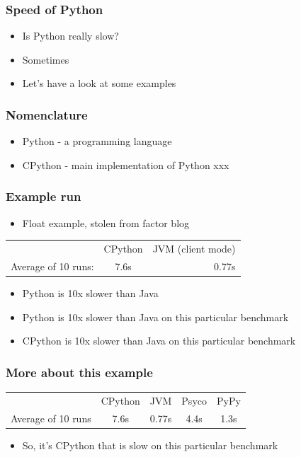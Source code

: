 \documentclass[utf8x]{beamer}
\begin{document}
\begin{frame}
  \frametitle{Speed of Python}
  \begin{itemize}
    \item Is Python really slow?
      \pause
    \item Sometimes
      \pause
    \item Let's have a look at some examples
  \end{itemize}

\end{frame}

\begin{frame}
  \frametitle{Nomenclature}
  \begin{itemize}
    \item Python - a programming language
    \item CPython - main implementation of Python
      xxx
  \end{itemize}
\end{frame}

\begin{frame}
  \frametitle{Example run}
  \begin{itemize}
    \item Float example, stolen from factor blog
  \end{itemize}
  \vspace{.5cm}
  \begin{tabular}{| l | c | r |}
    \hline
    & CPython & JVM (client mode) \\
    Average of 10 runs: & 7.6s & 0.77s \\
    \hline
  \end{tabular}
  \vspace{.5cm}
  \pause
  \begin{itemize}
    \item Python is 10x slower than Java
      \pause
    \item Python is 10x slower than Java on this particular benchmark
      \pause
    \item CPython is 10x slower than Java on this particular benchmark
  \end{itemize}
\end{frame}

\begin{frame}
  \frametitle{More about this example}
  \begin{tabular}{| l | c | c | c | c |}
    \hline
    & CPython & JVM & Psyco & PyPy \\
    Average of 10 runs & 7.6s & 0.77s & 4.4s & 1.3s \\
    \hline
  \end{tabular}
  \vspace{.5cm}
  \pause
  \begin{itemize}
    \item So, it's CPython that is slow on this particular benchmark
  \end{itemize}
\end{frame}
\end{document}
